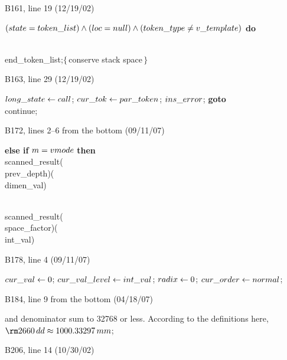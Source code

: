 {{\bugonpage B161, line 19 (12/19/02)

\ninepoint\noindent
{} $(\\{state}=\\{token\_list}) \land
 (\\{loc}=\\{null}) \land (\\{token\_type}\ne\\{v\_template})$ {\bf do}\par
\noindent\qquad\\{end\_token\_list};\quad$\{\,$conserve stack space$\,\}$

\bugonpage B163, line 29 (12/19/02)

\ninepoint\noindent
\quad$\\{long\_state}\gets\\{call}$;
$\\{cur\_tok}\gets\\{par\_token}$;
$\\{ins\_error}$;
{\bf goto} \\{continue};

\bugonpage B172, lines 2--6 from the bottom (09/11/07)

\ninepoint\noindent
{\bf else if\/} $m=\\{vmode}$ {\bf then} \\{scanned\_result}(\\{prev\_depth})(\\{dimen\_val})\par\noindent
{} \\{scanned\_result}(\\{space\_factor})(\\{int\_val})

\bugonpage B178, line 4 (09/11/07)

\ninepoint\noindent
\quad$\\{cur\_val}\gets0$;
$\\{cur\_val\_level}\gets\\{int\_val}$;
$\\{radix}\gets0$;
$\\{cur\_order}\gets\\{normal}$;

\bugonpage B184, line 9 from the bottom (04/18/07)

\tenpoint\noindent
and denominator sum to 32768 or less.
According to the definitions here, $\rm2660\,dd\approx1000.33297\,mm$;\kern-6.6pt\cutpar

\bugonpage B206, line 14 (10/30/02)

}}
